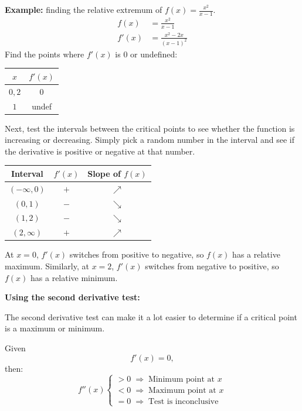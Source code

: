 \documentclass[12pt]{article}
\begin{document}
\noindent \textbf{Example:} finding the relative extremum of $f(x) = \frac{x^2}{x-1}$.
\begin{align*}
    f(x)  & = \frac{x^2}{x-1}        \\[6pt]
    f'(x) & = \frac{x^2-2x}{(x-1)^2}
\end{align*}
Find the points where $f'(x)$ is $0$ or undefined:
\begin{center}
    \begin{tabular}{|c|c|}
        \hline
        $x$    & $f'(x)$ \\
        \hline \hline
        $0, 2$ & $0$     \\
        \hline
        $1$    & undef   \\
        \hline
    \end{tabular}
\end{center}

Next, test the intervals between the critical points to see whether the function is increasing or decreasing. Simply pick a random number in the interval and see if the derivative is positive or negative at that number.
\begin{center}
    \begin{tabular}{|c|c|c|}
        \hline
        Interval       & $f'(x)$ & Slope of $f(x)$ \\
        \hline \hline
        $(-\infty, 0)$ & $+$     & $\nearrow$      \\
        \hline
        $(0, 1)$       & $-$     & $\searrow$      \\
        \hline
        $(1, 2)$       & $-$     & $\searrow$      \\
        \hline
        $(2, \infty)$  & $+$     & $\nearrow$      \\
        \hline
    \end{tabular}
\end{center}

At $x=0$, $f'(x)$ switches from positive to negative, so $f(x)$ has a relative maximum. Similarly, at $x=2$, $f'(x)$ switches from negative to positive, so $f(x)$ has a relative minimum.

\noindent \textbf{Using the second derivative test:}

The second derivative test can make it a lot easier to determine if a critical point is a maximum or minimum.

\noindent Given
\[ f'(x) = 0, \]
then:
\[ f''(x) \begin{cases}
        >0 \; \Rightarrow \; \text{Minimum point at $x$} \\
        <0 \; \Rightarrow \; \text{Maximum point at $x$} \\
        =0 \; \Rightarrow \; \text{Test is inconclusive}
    \end{cases} \]
\end{document}
